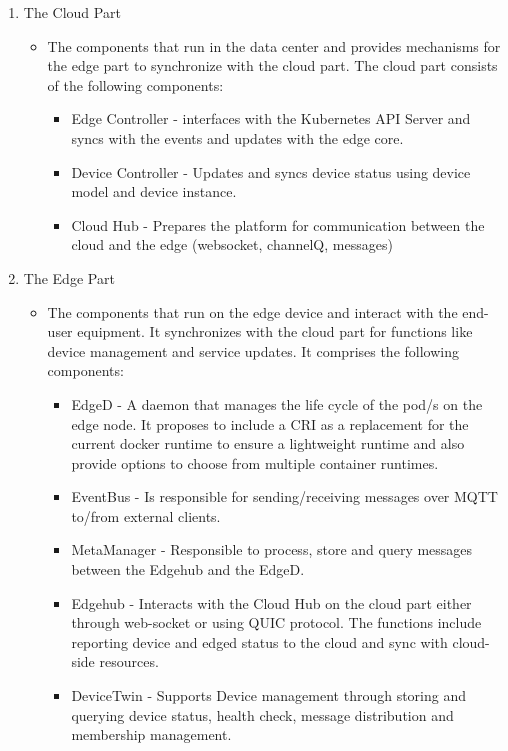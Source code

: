 \begin{enumerate}
    \item The Cloud Part
        \begin{itemize}
	    \item The components that run in the data center and provides mechanisms for the edge part to synchronize with the cloud part. The cloud part consists of the following components:
	        \begin{itemize}
	            \item Edge Controller - interfaces with the Kubernetes API Server and syncs with the events and updates with the edge core.
	            \item Device Controller - Updates and syncs device status using device model and device instance. 
		    \item Cloud Hub - Prepares the platform for communication between the cloud and the edge (websocket, channelQ, messages)
		\end{itemize}
	\end{itemize}
    \item The Edge Part
        \begin{itemize}
            \item The components that run on the edge device and interact with the end-user equipment. It synchronizes with the cloud part for functions like device management and service updates. It comprises the following components:
		\begin{itemize}
		    \item EdgeD - A daemon that manages the life cycle of the pod/s on the edge node. It proposes to include a CRI as a replacement for the current docker runtime to ensure a lightweight runtime and also provide options to choose from multiple container runtimes.
	            \item EventBus - Is responsible for sending/receiving messages over MQTT to/from external clients.
	            \item MetaManager - Responsible to process, store and query messages between the Edgehub and the EdgeD. 
	            \item Edgehub - Interacts with the Cloud Hub on the cloud part either through web-socket or using QUIC protocol. The functions include reporting device and edged status to the cloud and sync with cloud-side resources.
		    \item DeviceTwin - Supports Device management through storing and querying device status, health check, message distribution and membership management.
		\end{itemize}
	\end{itemize}
\end{enumerate}
